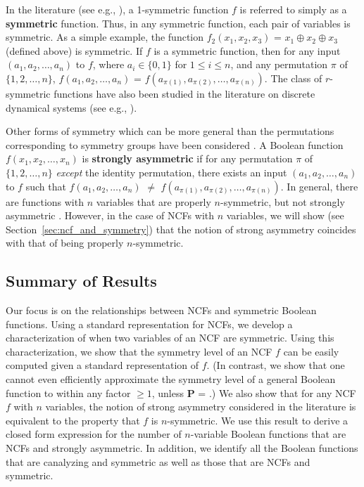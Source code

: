 In the literature (see e.g., \cite{Crama-Hammer-2011,HT-2016,Toth-etal-1977}),
a 1-symmetric function $f$ is referred to simply
as a \textbf{symmetric} function.
Thus, in any symmetric function, each pair of variables is symmetric.
As a simple example, the function $f_2(x_1, x_2, x_3)$ = 
$x_1 \oplus x_2 \oplus x_3$ (defined above) is symmetric.
If $f$ is a symmetric function, then for any
input $(a_1, a_2, \ldots, a_n)$ to $f$, where $a_i \in \{0,1\}$ for
$1 \leq i \leq n$, and any permutation $\pi$ of $\{1, 2, \ldots, n\}$,
$f(a_1, a_2, \ldots, a_n)$ = $f(a_{\pi(1)}, a_{\pi(2)}, \ldots, a_{\pi(n)})$.
The class of $r$-symmetric functions have also been
studied in the literature on discrete dynamical systems (see e.g., 
\cite{Barrett-etal-2007,Rosenkrantz-etal-2015,MR-2007}).

Other forms of symmetry which can be more general than the permutations 
corresponding to symmetry groups have been considered \cite{KS-2000}.
A Boolean function $f(x_1, x_2, \ldots, x_n)$
is \textbf{strongly asymmetric}
if for any permutation $\pi$ of $\{1, 2, \ldots, n\}$
\emph{except} the identity permutation,
there exists an input $(a_1, a_2, \ldots,  a_n)$
to $f$ such that $f(a_1, a_2, \ldots, a_n)$ $\neq$
$f(a_{\pi(1)}, a_{\pi(2)}, \ldots, a_{\pi(n)})$.
In general, there are functions with $n$ variables that are properly
$n$-symmetric, but not strongly asymmetric \cite{KS-2000}.
However, in the case of NCFs with $n$ variables, we will show 
(see Section~\ref{sec:ncf_and_symmetry}) that the notion of 
strong asymmetry coincides with that 
of being properly $n$-symmetric.


\subsection{Summary of Results}
\label{sse:contrib}

Our focus is on the relationships between 
NCFs and symmetric Boolean functions.
Using a standard representation for NCFs, we develop a
characterization of when two variables of an NCF are symmetric.
Using this characterization, we show
that the symmetry level of an NCF $f$
can be easily computed given a standard representation of $f$.
(In contrast, we show that 
one cannot even efficiently approximate the symmetry level of
a general Boolean function to within any factor $\geq 1$, 
unless \textbf{P} = \cnp.)
We also show that for any NCF $f$ with $n$ variables, the notion of
strong asymmetry considered in the literature is equivalent to
the property that $f$ is $n$-symmetric.
We use this result to derive a closed form expression for the
number of $n$-variable Boolean functions
that are NCFs and strongly asymmetric.
In addition, we identify all the Boolean functions that are 
canalyzing and symmetric as well as those that 
are NCFs and symmetric.

